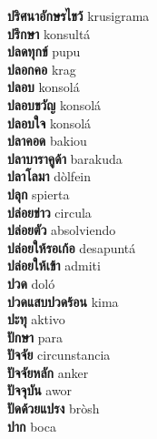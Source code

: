 \textbf{ ปริศนาอักษรไขว้  } krusigrama \\
\textbf{ ปรึกษา  } konsultá \\
\textbf{ ปลดทุกข์  } pupu \\
\textbf{ ปลอกคอ  } krag \\
\textbf{ ปลอบ  } konsolá \\
\textbf{ ปลอบขวัญ  } konsolá \\
\textbf{ ปลอบใจ  } konsolá \\
\textbf{ ปลาคอด  } bakiou \\
\textbf{ ปลาบาราคูด้า  } barakuda \\
\textbf{ ปลาโลมา  } dòlfein \\
\textbf{ ปลุก  } spierta \\
\textbf{ ปล่อยข่าว  } circula \\
\textbf{ ปล่อยตัว  } absolviendo \\
\textbf{ ปล่อยให้รอเก้อ  } desapuntá \\
\textbf{ ปล่อยให้เข้า  } admiti \\
\textbf{ ปวด  } doló \\
\textbf{ ปวดแสบปวดร้อน  } kima \\
\textbf{ ปะทุ  } aktivo \\
\textbf{ ปักษา  } para \\
\textbf{ ปัจจัย  } circunstancia \\
\textbf{ ปัจจัยหลัก  } anker \\
\textbf{ ปัจจุบัน  } awor \\
\textbf{ ปัดด้วยแปรง  } bròsh \\
\textbf{ ปาก  } boca \\
